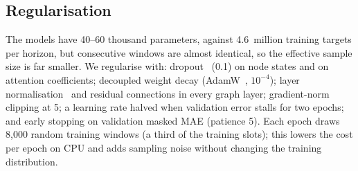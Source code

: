 \subsection{Regularisation}
The models have 40--60 thousand parameters, against 4.6~million training targets per horizon, but consecutive windows are almost identical, so the effective sample size is far smaller. We regularise with: dropout~\cite{srivastava2014dropout} (0.1) on node states and on attention coefficients; decoupled weight decay (AdamW~\cite{loshchilov2019adamw}, $10^{-4}$); layer normalisation~\cite{ba2016layernorm} and residual connections in every graph layer; gradient-norm clipping at 5; a learning rate halved when validation error stalls for two epochs; and early stopping on validation masked MAE (patience 5). Each epoch draws 8{,}000 random training windows (a third of the training slots); this lowers the cost per epoch on CPU and adds sampling noise without changing the training distribution.
